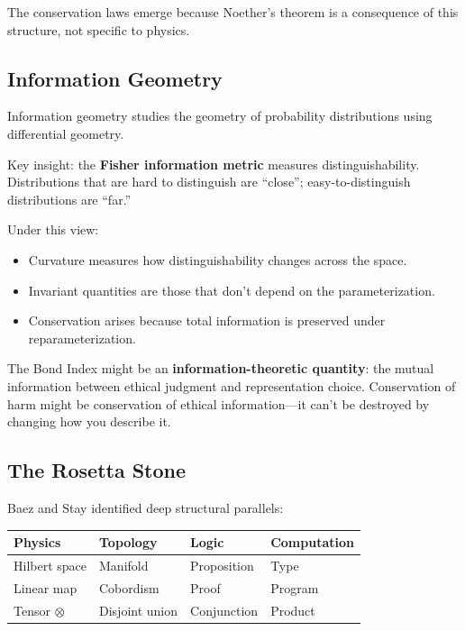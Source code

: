 \documentclass[12pt,letterpaper]{article}
\theoremstyle{definition}
\theoremstyle{remark}
\begin{document}
The conservation laws emerge because Noether's theorem is a consequence of this structure, not specific to physics.

\subsection{Information Geometry}

Information geometry studies the geometry of probability distributions using differential geometry.

Key insight: the \textbf{Fisher information metric} measures distinguishability. Distributions that are hard to distinguish are ``close''; easy-to-distinguish distributions are ``far.''

Under this view:
\begin{itemize}
    \item Curvature measures how distinguishability changes across the space.
    \item Invariant quantities are those that don't depend on the parameterization.
    \item Conservation arises because total information is preserved under reparameterization.
\end{itemize}

The Bond Index might be an \textbf{information-theoretic quantity}: the mutual information between ethical judgment and representation choice. Conservation of harm might be conservation of ethical information---it can't be destroyed by changing how you describe it.

\subsection{The Rosetta Stone}

Baez and Stay \cite{baez2009rosetta} identified deep structural parallels:

\begin{center}
\begin{tabular}{llll}
\toprule
\textbf{Physics} & \textbf{Topology} & \textbf{Logic} & \textbf{Computation} \\
\midrule
Hilbert space & Manifold & Proposition & Type \\
Linear map & Cobordism & Proof & Program \\
Tensor $\otimes$ & Disjoint union & Conjunction & Product \\
\bottomrule
\end{tabular}
\end{center}
\end{document}
